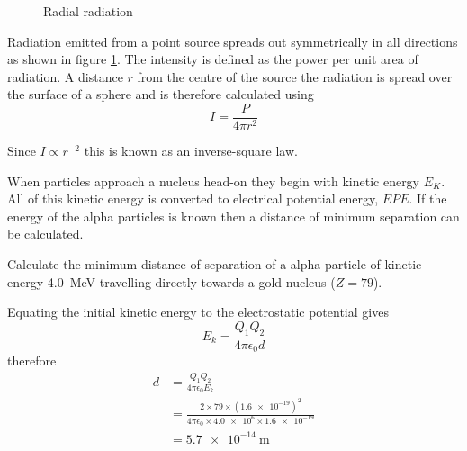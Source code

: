 \documentclass[main.tex]{subfiles}
\begin{document}

\begin{figure}[h]
  \begin{center}
  \end{center}
  \caption{Radial radiation}
  \label{radiation-spreading}
\end{figure}

Radiation emitted from a point source spreads out symmetrically in all directions as shown in figure \ref{radiation-spreading}. The intensity is defined as the power per unit area of radiation. A distance $r$ from the centre of the source the radiation is spread over the surface of a sphere and is therefore calculated using
\begin{equation}
  I = \frac{P}{4\pi r^2}
\end{equation}

Since $I\propto r^{-2}$ this is known as an inverse-square law.


When particles approach a nucleus head-on they begin with kinetic energy $E_K$. All of this kinetic energy is converted to electrical potential energy, $EPE$. If the energy of the alpha particles is known then a distance of minimum separation can be calculated.

\begin{example}
  Calculate the minimum distance of separation of a alpha particle of kinetic energy \SI{4.0}{\mega\electronvolt} travelling directly towards a gold nucleus ($Z=79$).

  \answer

  Equating the initial kinetic energy to the electrostatic potential gives
  \[ E_k = \frac{Q_1 Q_2}{4\pi \epsilon_0 d} \]
  therefore
  \begin{align*}
    d &= \frac{Q_1 Q_2}{4 \pi \epsilon_0 E_k} \\
    &= \frac{2\times79\times (\num{1.6e-19})^2}{4\pi \epsilon_0 \times \num{4.0e6} \times \num{1.6e-19}} \\
    &= \SI{5.7e-14}{\meter}
  \end{align*}
\end{example}
\end{document}
